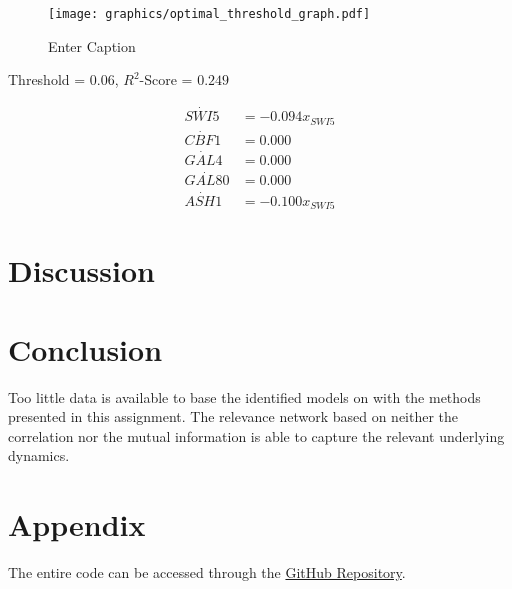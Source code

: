 \documentclass{article}
\begin{document}
\begin{figure}
    \centering
    \texttt{[image: graphics/optimal\_threshold\_graph.pdf]}
    \caption{Enter Caption}
    \label{fig:enter-label}
\end{figure}


\hline
Threshold = $0.06$, $R^2$-Score = $0.249$

\begin{align*}
\dot{SWI5} &= -0.094 x_{SWI5}\\
\dot{CBF1} &= 0.000 \\
\dot{GAL4} &= 0.000 \\
\dot{GAL80} &= 0.000 \\
\dot{ASH1} &= -0.100 x_{SWI5}
\end{align*}


\section{Discussion}



\section{Conclusion}

Too little data is available to base the identified models on with the methods presented in this assignment. The relevance network based on neither the correlation nor the mutual information is able to capture the relevant underlying dynamics.

\newpage



\newpage
\section{Appendix}

The entire code can be accessed through the \href{https://github.com/JanStern/Modeling-Biological-Networks-Assignment}{GitHub Repository}.
\end{document}
